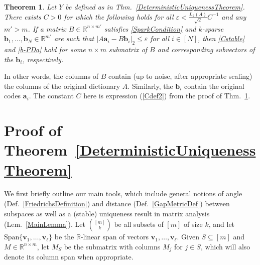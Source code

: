\documentclass[journal, twocolumn]{IEEEtran}
\newtheorem{theorem}{Theorem}
\begin{document}
\begin{theorem}\label{DeterministicUniquenessTheorem2}
Let $Y$ be defined as in Thm.~\ref{DeterministicUniquenessTheorem}. There exists $C > 0$ for which the following holds for all $\varepsilon < \frac{L_2(A)}{\sqrt{2}}C^{-1}$ and any $m' > m$. If a matrix $B \in \mathbb{R}^{n \times m'}$ satisfies \eqref{SparkCondition} and $k$-sparse $\mathbf{b}_1, \ldots, \mathbf{b}_N \in \mathbb{R}^{m'}$ are such that \mbox{$|A\mathbf{a}_i - B\mathbf{b}_i|_2 \leq \varepsilon$} for all $i \in [N]$, then \eqref{Cstable} and \eqref{b-PDa} hold for some $n \times m$ submatrix of $B$ and corresponding subvectors of the $\mathbf{b}_i$, respectively. 
\end{theorem}

In other words, the columns of $B$ contain (up to noise, after appropriate scaling) the columns of the original dictionary $A$. Similarly, the $\mathbf{b}_i$ contain the original codes $\mathbf{a}_i$. The constant $C$ here is expression (\ref{Cdef2}) from the proof of Thm.~\ref{DeterministicUniquenessTheorem2}. 


\vspace{-.08 cm}

\section{Proof of Theorem~\ref{DeterministicUniquenessTheorem}}\label{DUT}
We first briefly outline our main tools, which include general notions of angle (Def.~\ref{FriedrichsDefinition}) and distance (Def.~\ref{GapMetricDef}) between subspaces as well as a (stable) uniqueness result in matrix analysis (Lem.~\ref{MainLemma}).
Let ${[m] \choose k}$ be all subsets of $[m]$ of size $k$, and let $\text{Span}\{\mathbf{v}_1, \ldots, \mathbf{v}_\ell\}$ be the $\mathbb{R}$-linear span of vectors $\mathbf{v}_1, \ldots, \mathbf{v}_\ell$. Given $S \subseteq [m]$ and $M \in \mathbb{R}^{n \times m}$, let $M_S$ be the submatrix with columns $M_j$ for $j \in S$, which will also denote its column span when appropriate.  
\end{document}
